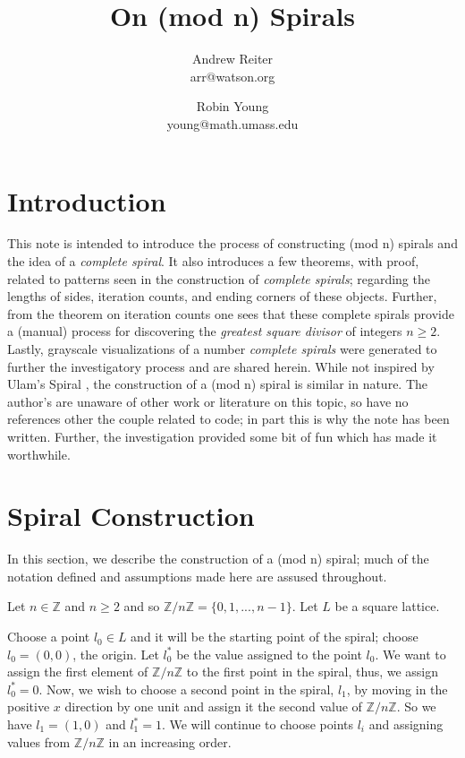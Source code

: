\documentclass[11pt]{amsart}
\title{On (mod n) Spirals}
\author{Andrew Reiter\\
arr@watson.org}
\author{Robin Young\\
young@math.umass.edu}
\theoremstyle{mydef}
\begin{document}
\maketitle
\section{Introduction}
This note is intended to introduce the process of constructing (mod n) spirals and the idea of a \textit{complete spiral}.  It also introduces a few theorems, with proof, related to patterns seen in the construction of \textit{complete spirals}; regarding the lengths of sides, iteration counts, and ending corners of these objects. Further, from the theorem on iteration counts one sees that these complete spirals provide a (manual) process for discovering the \textit{greatest square divisor} of integers $n \ge 2$. Lastly, grayscale visualizations of a number \textit{complete spirals} were generated to further the investigatory process and are shared herein. While not inspired by Ulam's Spiral \cite{Ulam}, the construction of  a (mod n) spiral is similar in nature. The author's are unaware of other work or literature on this topic, so have no references other the couple related to code; in part this is why the note has been written. Further, the investigation provided some bit of fun which has made it worthwhile.

\section{Spiral Construction}
In this section, we describe the construction of a (mod n) spiral; much of the notation defined and assumptions made here are assused throughout.

Let $n \in \mathbb{Z}$ and $n \ge 2$ and so $\mathbb{Z}/n\mathbb{Z} = \{ 0, 1, ..., n-1 \}$. Let $L$ be a square lattice. 

Choose a point $l_0 \in L$ and it will be the starting point of the spiral; choose $l_0 = (0, 0)$, the origin. Let $l^*_0$ be the value assigned to the point $l_0$. We want to assign the first element of $\mathbb{Z}/n\mathbb{Z}$ to the first point in the spiral, thus, we assign $l^*_0 = 0$. Now, we wish to choose a second point in the spiral, $l_1$, by moving in the positive $x$ direction by one unit and assign it the second value of $\mathbb{Z}/n\mathbb{Z}$. So we have $l_1 = (1, 0)$ and $l^*_1 = 1$.  We will continue to choose points $l_i$ and assigning values from $\mathbb{Z}/n\mathbb{Z}$ in an increasing order.
\end{document}
